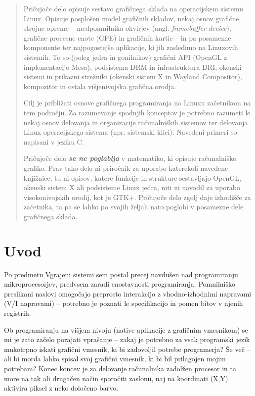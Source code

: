 \documentclass{article}
\begin{document}
\begin{abstract}
    Pričujoče delo opisuje sestavo grafičnega sklada na operacijskem sistemu Linux.
    Opisuje posplošen model grafičnih skladov, nekaj osnov grafične strojne opreme --
    medpomnilnika okvirjev (angl. \textit{framebuffer device}), grafične procesne enote (GPE)
    in grafičnih kartic -- in pa posamezne komponente ter najpogostejše aplikacije,
    ki jih zasledimo na Linuxovih sistemih. To so (poleg jedra in gonilnikov) grafični API
    (OpenGL z implementacijo Mesa), podsistema DRM in infrastruktura DRI, okenski sistemi in
    prikazni strežniki (okenski sistem X in Wayland Compositor), kompozitor in ostala
    višjenivojska grafična orodja.

    Cilj je približati osnove grafičnega programiranja na Linuxu začetnikom na tem
    področju. Za razumevanje spodnjih konceptov je potrebno razumeti le nekaj osnov
    delovanja in organizacije računalniških sistemov ter delovanja Linux operacijskega sistema 
    (npr. sistemski klici). Navedeni primeri so napisani v jeziku C.

    Pričujoče delo \textbf{\textit{se ne poglablja}} v matematiko, ki opisuje računalniško 
    grafiko. Prav tako delo ni priročnik za uporabo katerekoli navedene knjižnice; tu ni opisov,
    katere funkcije in strukture sestavljajo OpenGL, okenski sistem X ali podsisteme Linux
    jedra, niti ni navodil za uporabo visokonivojskih orodij, kot je GTK+. Pričujoče delo
    zgolj daje izhodišče za začetnika, ta pa se lahko po svojih željah nato poglobi v
    posamezne dele grafičnega sklada.
\end{abstract}
\newpage
{}

\section*{Uvod}
Po predmetu Vgrajeni sistemi sem postal precej navdušen nad programiranju mikroprocesorjev, predvsem zaradi enostavnosti programiranja. Pomnilniško preslikani naslovi omogočajo preprosto interakcijo z vhodno-izhodnimi napravami (V/I napravami) -- potrebno je poznati le specifikacijo in pomen bitov v njenih registrih.

Ob programiranju na višjem nivoju (native aplikacije z grafičnim vmesnikom) se mi je zato začelo porajati vprašanje -- zakaj je potrebno za vsak programski jezik mukotrpno iskati grafični vmesnik, ki bi zadovoljil potrebe programerja? Še več -- ali bi morda lahko spisal svoj grafični vmesnik, ki bi bil prilagojen mojim potrebam? Konec koncev je za delovanje računalnika zadolžen procesor in ta more na tak ali drugačen način sporočiti zaslonu, naj na koordinati (X,Y) aktivira piksel z neko določeno barvo.
\end{document}
